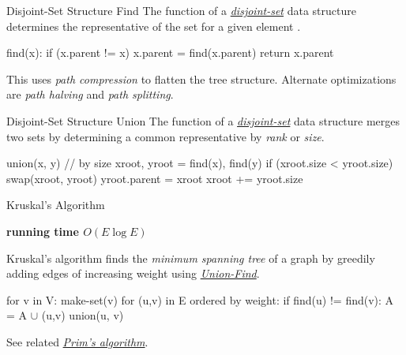 \documentclass{cognito}
\begin{document}
\begin{note}{Disjoint-Set Structure Find}
	The  function of a \hyperref[note:Disjoint-Set Data Structure]{\it disjoint-set} data structure
	determines the representative of the set for a given element .
	\begin{largecode}
 find(x):
 	if (x.parent != x) x.parent = find(x.parent)
	return x.parent
	\end{largecode}
	\begin{remark} This  uses {\it path compression} to flatten the tree structure.
	Alternate optimizations are {\it path halving} and {\it path splitting}. \end{remark}
	\vspace{-5pt}
\end{note}

\begin{note}{Disjoint-Set Structure Union}
	The  function of a \hyperref[note:Disjoint-Set Data Structure]{\it disjoint-set} data structure merges two sets
	by determining a common representative by {\it rank} or {\it size}.
	
	\begin{largecode}
 union(x, y)  // by size
 	xroot, yroot = find(x), find(y)
	if (xroot.size < yroot.size) swap(xroot, yroot)
	yroot.parent = xroot
	xroot += yroot.size
	\end{largecode}
	\vspace{-5pt}
\end{note}

\begin{note}{Kruskal's Algorithm}
	\begin{mdframed}[linecolor=black!25!white]
		\bf running time $O(E \log E)$
	\end{mdframed}
	Kruskal's algorithm finds the {\it minimum spanning tree} of a graph by greedily adding edges of increasing weight
	using \hyperref[note:Disjoint-Set Data Structure]{\it Union-Find}.
	
	\begin{largecode}
 for v in V: make-set(v)
 for (u,v) in E ordered by weight:
 	if find(u) != find(v):
		A = A $\cup$ {(u,v)}
		union(u, v)
	\end{largecode}
	\begin{remark} See related \hyperref[note:Prim's Algorithm]{\it Prim's algorithm}.\end{remark}\vspace{-5pt}
\end{note}
\end{document}
